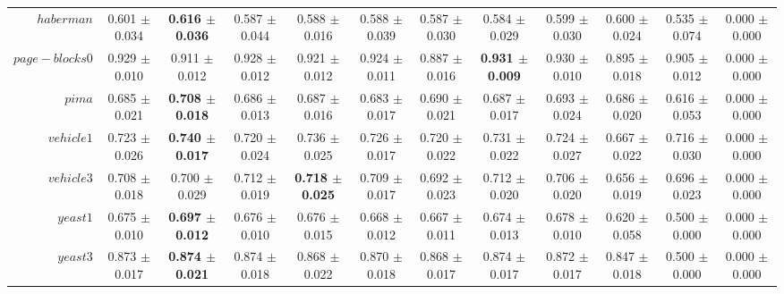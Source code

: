 \begin{table}[!ht]
{\begin{tabular}{r c c c c c c c c c c c}
$haberman$ & 0.601 $\pm$ 0.034 & \textbf{0.616 $\pm$ 0.036} & 0.587 $\pm$ 0.044 & 0.588 $\pm$ 0.016 & 0.588 $\pm$ 0.039 & 0.587 $\pm$ 0.030 & 0.584 $\pm$ 0.029 & 0.599 $\pm$ 0.030 & 0.600 $\pm$ 0.024 & 0.535 $\pm$ 0.074 & 0.000 $\pm$ 0.000 \\
$page-blocks0$ & 0.929 $\pm$ 0.010 & 0.911 $\pm$ 0.012 & 0.928 $\pm$ 0.012 & 0.921 $\pm$ 0.012 & 0.924 $\pm$ 0.011 & 0.887 $\pm$ 0.016 & \textbf{0.931 $\pm$ 0.009} & 0.930 $\pm$ 0.010 & 0.895 $\pm$ 0.018 & 0.905 $\pm$ 0.012 & 0.000 $\pm$ 0.000 \\
$pima$ & 0.685 $\pm$ 0.021 & \textbf{0.708 $\pm$ 0.018} & 0.686 $\pm$ 0.013 & 0.687 $\pm$ 0.016 & 0.683 $\pm$ 0.017 & 0.690 $\pm$ 0.021 & 0.687 $\pm$ 0.017 & 0.693 $\pm$ 0.024 & 0.686 $\pm$ 0.020 & 0.616 $\pm$ 0.053 & 0.000 $\pm$ 0.000 \\
$vehicle1$ & 0.723 $\pm$ 0.026 & \textbf{0.740 $\pm$ 0.017} & 0.720 $\pm$ 0.024 & 0.736 $\pm$ 0.025 & 0.726 $\pm$ 0.017 & 0.720 $\pm$ 0.022 & 0.731 $\pm$ 0.022 & 0.724 $\pm$ 0.027 & 0.667 $\pm$ 0.022 & 0.716 $\pm$ 0.030 & 0.000 $\pm$ 0.000 \\
$vehicle3$ & 0.708 $\pm$ 0.018 & 0.700 $\pm$ 0.029 & 0.712 $\pm$ 0.019 & \textbf{0.718 $\pm$ 0.025} & 0.709 $\pm$ 0.017 & 0.692 $\pm$ 0.023 & 0.712 $\pm$ 0.020 & 0.706 $\pm$ 0.020 & 0.656 $\pm$ 0.019 & 0.696 $\pm$ 0.023 & 0.000 $\pm$ 0.000 \\
$yeast1$ & 0.675 $\pm$ 0.010 & \textbf{0.697 $\pm$ 0.012} & 0.676 $\pm$ 0.010 & 0.676 $\pm$ 0.015 & 0.668 $\pm$ 0.012 & 0.667 $\pm$ 0.011 & 0.674 $\pm$ 0.013 & 0.678 $\pm$ 0.010 & 0.620 $\pm$ 0.058 & 0.500 $\pm$ 0.000 & 0.000 $\pm$ 0.000 \\
$yeast3$ & 0.873 $\pm$ 0.017 & \textbf{0.874 $\pm$ 0.021} & 0.874 $\pm$ 0.018 & 0.868 $\pm$ 0.022 & 0.870 $\pm$ 0.018 & 0.868 $\pm$ 0.017 & 0.874 $\pm$ 0.017 & 0.872 $\pm$ 0.017 & 0.847 $\pm$ 0.018 & 0.500 $\pm$ 0.000 & 0.000 $\pm$ 0.000 \\
\end{tabular}}
\end{table}

